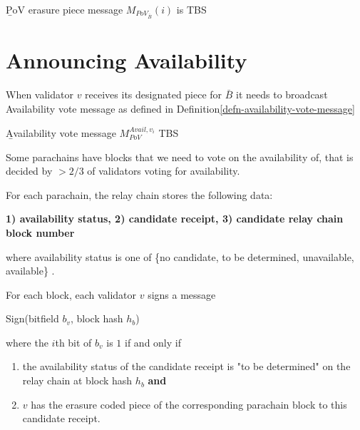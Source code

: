 \begin{definition}
  \label{defn-pov-erasure-piece-message}
        {\b PoV erasure piece message} $M_{PoV_{\bar{B}}}(i)$ is TBS
\end{definition}

\section{Announcing Availability}\label{sect-voting-on-availability}

When validator $v$ receives its designated piece for $\bar{B}$ it needs to
broadcast Availability vote message as defined in
Definition\ref{defn-availability-vote-message}
\begin{definition}
  \label{defn-availability-vote-message}
        {\b Availability vote message} $M_{PoV}^{Avail,v_i}$ TBS
\end{definition}

Some parachains have blocks that we need to vote on the availability of, that is
decided by $> 2/3$ of validators voting for availability. 
\newline

For each parachain, the relay chain stores the following data:

\textbf{1) availability status, 2) candidate receipt, 3) candidate relay chain block number}

where availability status is one of \{no candidate, to be determined,
unavailable, available\} .

For each block, each validator $v$ signs a message

Sign(bitfield $b_v$, block hash $h_b$)

where the $i$th bit of $b_v$ is $1$ if and only if

\begin{enumerate}
\item the availability status of the candidate receipt is "to be determined" on
the relay chain at block hash $h_b$ \textbf{and}

\item $v$ has the erasure coded piece of the corresponding parachain block to
this candidate receipt.
\end{enumerate}

